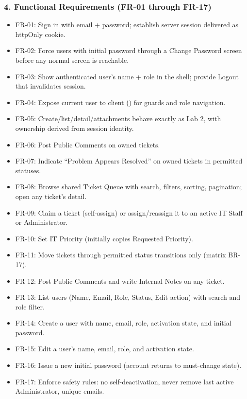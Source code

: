 \documentclass[11pt,a4paper]{article}
\begin{document}
\subsubsection*{4. Functional Requirements (FR-01 through FR-17)}
\begin{itemize}
\item FR-01: Sign in with email + password; establish server session delivered as httpOnly cookie.
\item FR-02: Force users with initial password through a Change Password screen before any normal screen is reachable.
\item FR-03: Show authenticated user's name + role in the shell; provide Logout that invalidates session.
\item FR-04: Expose current user to client () for guards and role navigation.
\item FR-05: Create/list/detail/attachments behave exactly as Lab 2, with ownership derived from session identity.
\item FR-06: Post Public Comments on owned tickets.
\item FR-07: Indicate ``Problem Appears Resolved'' on owned tickets in permitted statuses.
\item FR-08: Browse shared Ticket Queue with search, filters, sorting, pagination; open any ticket's detail.
\item FR-09: Claim a ticket (self-assign) or assign/reassign it to an active IT Staff or Administrator.
\item FR-10: Set IT Priority (initially copies Requested Priority).
\item FR-11: Move tickets through permitted status transitions only (matrix BR-17).
\item FR-12: Post Public Comments and write Internal Notes on any ticket.
\item FR-13: List users (Name, Email, Role, Status, Edit action) with search and role filter.
\item FR-14: Create a user with name, email, role, activation state, and initial password.
\item FR-15: Edit a user's name, email, role, and activation state.
\item FR-16: Issue a new initial password (account returns to must-change state).
\item FR-17: Enforce safety rules: no self-deactivation, never remove last active Administrator, unique emails.
\end{itemize}
\end{document}
